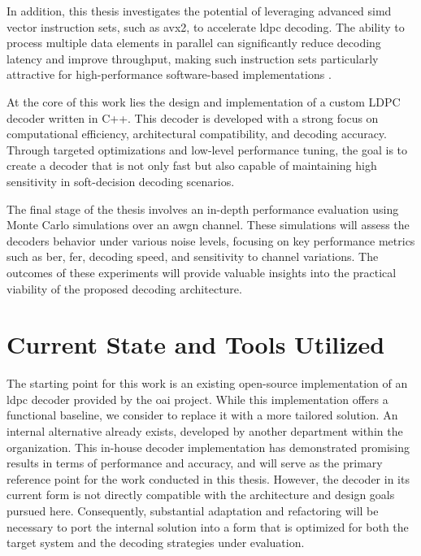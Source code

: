 \documentclass[../main.tex]{subfiles}
\begin{document}
In addition, this thesis investigates the potential of leveraging advanced \gls{simd} vector instruction sets, such as \gls{avx2}, to accelerate \gls{ldpc} decoding.
The ability to process multiple data elements in parallel can significantly reduce decoding latency and improve throughput, making such instruction sets particularly attractive for high-performance software-based implementations \cite{9020587}.

At the core of this work lies the design and implementation of a custom LDPC decoder written in C++.
This decoder is developed with a strong focus on computational efficiency, architectural compatibility, and decoding accuracy.
Through targeted optimizations and low-level performance tuning, the goal is to create a decoder that is not only fast but also capable of maintaining high sensitivity in soft-decision decoding scenarios.

The final stage of the thesis involves an in-depth performance evaluation using Monte Carlo simulations over an \gls{awgn} channel.
These simulations will assess the decoders behavior under various noise levels, focusing on key performance metrics such as \gls{ber}, \gls{fer}, decoding speed, and sensitivity to channel variations.
The outcomes of these experiments will provide valuable insights into the practical viability of the proposed decoding architecture.


\section{Current State and Tools Utilized}
\label{sec:current_state}

The starting point for this work is an existing open-source implementation of an \gls{ldpc} decoder provided by the \gls{oai} project. 
While this implementation offers a functional baseline, we consider to replace it with a more tailored solution.
An internal alternative already exists, developed by another department within the organization. 
This in-house decoder implementation has demonstrated promising results in terms of performance and accuracy, and will serve as the primary reference point for the work conducted in this thesis. 
However, the decoder in its current form is not directly compatible with the architecture and design goals pursued here. 
Consequently, substantial adaptation and refactoring will be necessary to port the internal solution into a form that is optimized for both the target system and the decoding strategies under evaluation.
\end{document}
